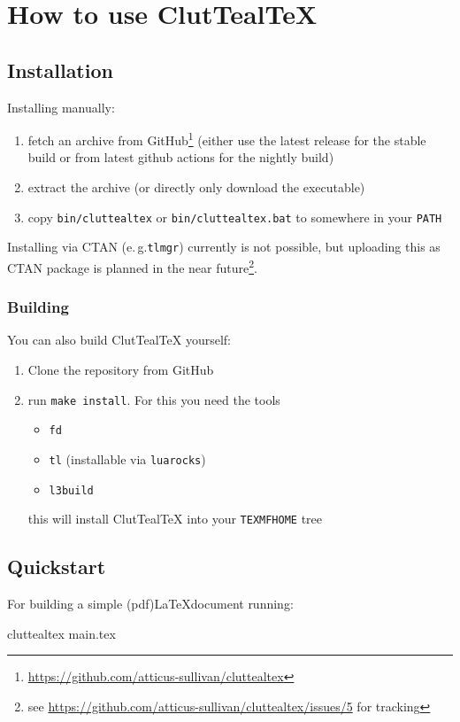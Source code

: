 \documentclass[a4paper, 11pt]{scrartcl}
\newcommand\eg{e.\,g.\xspace}
\let\TeXold\TeX
\newcommand\CluttealTeX{ClutTeal\TeX\xspace}
\renewcommand\TeX{\TeXold\xspace}
\begin{document}
\section{How to use \CluttealTeX}
\subsection{Installation}
Installing manually:
\begin{enumerate}
	\renewcommand{\theenumi}{\arabic{enumi}}
	\item fetch an archive from GitHub\footnote{\url{https://github.com/atticus-sullivan/cluttealtex}}
		(either use the latest release for the stable build or from latest github actions for the nightly build)
	\item extract the archive (or directly only download the executable)
	\item copy \texttt{bin/cluttealtex} or \texttt{bin/cluttealtex.bat} to somewhere in your \texttt{PATH}
\end{enumerate}

Installing via CTAN (\eg \texttt{tlmgr}) currently is not possible, but uploading this as CTAN package is planned in the near future\footnote{see \url{https://github.com/atticus-sullivan/cluttealtex/issues/5} for tracking}.

\subsubsection{Building}
You can also build \CluttealTeX yourself:
\begin{enumerate}
	\renewcommand{\theenumi}{\arabic{enumi}}
	\item Clone the repository from GitHub
	\item run \texttt{make install}. For this you need the tools
		\begin{itemize}
			\item \texttt{fd}
			\item \texttt{tl} (installable via \texttt{luarocks})
			\item \texttt{l3build}
		\end{itemize}
		this will install \CluttealTeX into your \texttt{TEXMFHOME} tree
\end{enumerate}

\subsection{Quickstart}
For building a simple (pdf)\LaTeX document running:
\begin{boxcmd}
  cluttealtex main.tex
\end{boxcmd}
\end{document}
